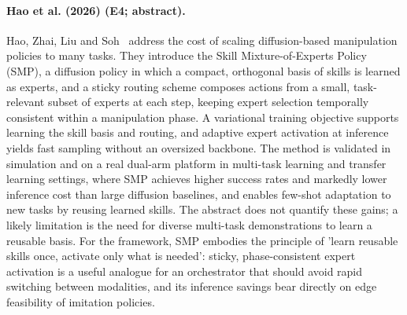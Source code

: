 \documentclass[10pt,a4paper]{article}
\begin{document}
\paragraph{Hao et al. (2026) (E4; abstract).} Hao, Zhai, Liu and Soh~\cite{SMP2026} address the cost of scaling diffusion-based manipulation policies to many tasks. They introduce the Skill Mixture-of-Experts Policy (SMP), a diffusion policy in which a compact, orthogonal basis of skills is learned as experts, and a sticky routing scheme composes actions from a small, task-relevant subset of experts at each step, keeping expert selection temporally consistent within a manipulation phase. A variational training objective supports learning the skill basis and routing, and adaptive expert activation at inference yields fast sampling without an oversized backbone. The method is validated in simulation and on a real dual-arm platform in multi-task learning and transfer learning settings, where SMP achieves higher success rates and markedly lower inference cost than large diffusion baselines, and enables few-shot adaptation to new tasks by reusing learned skills. The abstract does not quantify these gains; a likely limitation is the need for diverse multi-task demonstrations to learn a reusable basis. For the framework, SMP embodies the principle of 'learn reusable skills once, activate only what is needed': sticky, phase-consistent expert activation is a useful analogue for an orchestrator that should avoid rapid switching between modalities, and its inference savings bear directly on edge feasibility of imitation policies.
\end{document}
